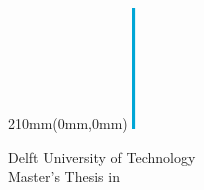 
\begin {textblock*}{210mm}(0mm,0mm)
\noindent
\includegraphics[height=3.2cm]{pics/block}
\sffamily
\vspace{.8cm}
\begin{center}
\Large
Delft University of Technology\\
Master's Thesis in \reportMSC\\
\vspace{2cm}
\parbox{170mm}{\bfseries\centering\Huge\reportTitle}\\
\vspace{1cm}
\parbox{170mm}{\bfseries\centering\reportAuthor}

\end{center}
\end{textblock*}

